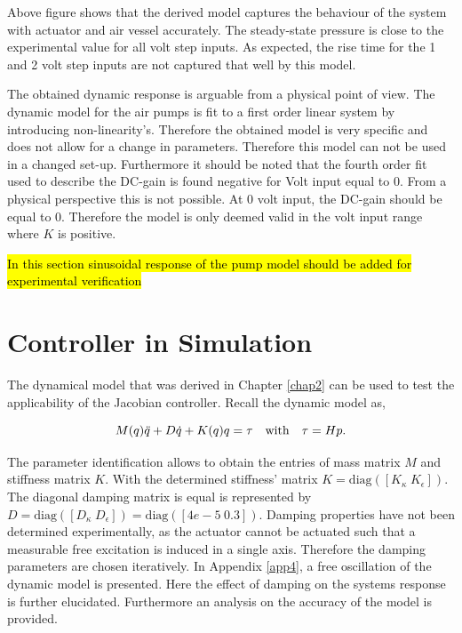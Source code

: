 Above figure shows that the derived model captures the behaviour of the system with actuator and air vessel accurately. The steady-state pressure is close to the experimental value for all volt step inputs. As expected, the rise time for the 1 and 2 volt step inputs are not captured that well by this model.

The obtained dynamic response is arguable from a physical point of view. The dynamic model for the air pumps is fit to a first order linear system by introducing non-linearity's. Therefore the obtained model is very specific and does not allow for a change in parameters. Therefore this model can not be used in a changed set-up. Furthermore it should be noted that the fourth order fit used to describe the DC-gain is found negative for Volt input equal to 0. From a physical perspective this is not possible. At 0 volt input, the DC-gain should be equal to 0. Therefore the model is only deemed valid in the volt input range where $K$ is positive.

\hl{In this section sinusoidal response of the pump model should be added for experimental verification}


\section{Controller in Simulation}

The dynamical model that was derived in Chapter \ref{chap2} can be used to test the applicability of the Jacobian controller. Recall the dynamic model as, 


\begin{equation}
    M(q)\Ddot{q} + D\dot{q} + K(q)q = \tau \hspace{10pt} \text{with} \hspace{10pt} \tau = Hp.
    \label{eq4:dynamicmodel}
\end{equation}

The parameter identification allows to obtain the entries of mass matrix $M$ and stiffness matrix $K$. With the determined stiffness' matrix $K = \text{diag}([K_\kappa \hspace{3pt} K_\epsilon])$. The diagonal damping matrix is equal is represented by $D = \text{diag}([D_\kappa \hspace{3pt} D_\epsilon]) = \text{diag}([4e-5 \hspace{3pt} 0.3])$. Damping properties have not been determined experimentally, as the actuator cannot be actuated such that a measurable free excitation is induced in a single axis. Therefore the damping parameters are chosen iteratively. In Appendix \ref{app4}, a free oscillation of the dynamic model is presented. Here the effect of damping on the systems response is further elucidated. Furthermore an analysis on the accuracy of the model is provided.

